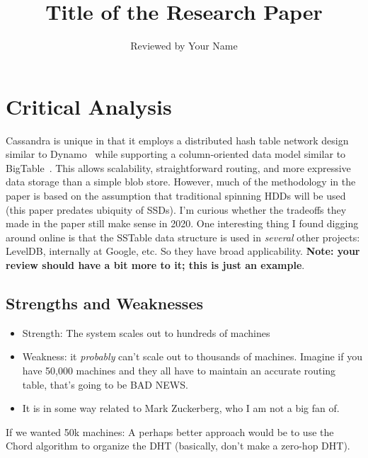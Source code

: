 \documentclass[notitlepage,12pt]{article}
\date{\vspace{-5ex}}
\begin{document}
\title{Title of the Research Paper}
\author{Reviewed by Your Name}
\maketitle



\section{Critical Analysis}
Cassandra is unique in that it employs a distributed hash table network design similar to Dynamo~\cite{decandia2007dynamo} while supporting a column-oriented data model similar to BigTable~\cite{chang2008bigtable}. This allows scalability, straightforward routing, and more expressive data storage than a simple blob store. However, much of the methodology in the paper is based on the assumption that traditional spinning HDDs will be used (this paper predates ubiquity of SSDs). I'm curious whether the tradeoffs they made in the paper still make sense in 2020. One interesting thing I found digging around online is that the SSTable data structure is used in \emph{several} other projects: LevelDB, internally at Google, etc. So they have broad applicability. \textbf{Note: your review should have a bit more to it; this is just an example}.

\subsection{Strengths and Weaknesses}
\begin{itemize}
    \item Strength: The system scales out to hundreds of machines
    \item Weakness: it \textit{probably} can't scale out to thousands of machines. Imagine if you have 50,000 machines and they all have to maintain an accurate routing table, that's going to be BAD NEWS.
    \item It is in some way related to Mark Zuckerberg, who I am not a big fan of.
\end{itemize}

If we wanted 50k machines: A perhaps better approach would be to use the Chord algorithm to organize the DHT (basically, don't make a zero-hop DHT).
\end{document}
